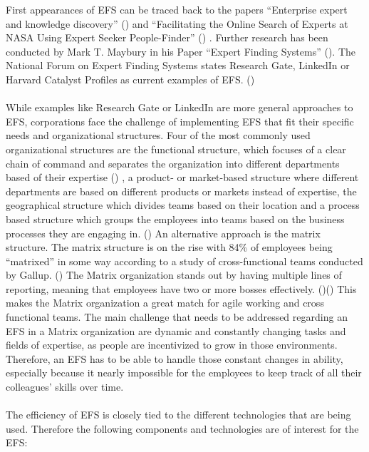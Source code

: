 First appearances of \ac{EFS} can be traced back to the papers “Enterprise expert and knowledge discovery” (\cite{mattox_enterprise_1999}) and 
“Facilitating the Online Search of Experts at NASA Using Expert Seeker People-Finder” (\cite{becerra-fernandez_facilitating_nodate}) . Further research has been 
conducted by Mark T. Maybury in his Paper “Expert Finding Systems” (\cite{maybury_expert_2006}). The National Forum on Expert Finding Systems states Research 
Gate, LinkedIn or Harvard Catalyst Profiles as current examples of \ac{EFS}. (\cite{noauthor_national_nodate})
\\ \\
While examples like Research Gate or LinkedIn are more 
general approaches to \ac{EFS}, corporations face the challenge of implementing \ac{EFS} that fit their specific needs and organizational structures.
Four of the most commonly used organizational structures are the functional structure, which focuses of a clear chain of command and separates the organization 
into different departments based of their expertise (\cite{noauthor_what_nodate-1}) , a product- or market-based structure where different departments are based on 
different products or markets instead of expertise, the geographical structure which divides teams based on their location and a process based structure which 
groups the employees into teams based on the business processes they are engaging in. (\cite{organ_7_2023})   
An alternative approach is the matrix structure. The matrix structure is on the rise with 84\% of employees being “matrixed” in some way according to a study of 
cross-functional teams conducted by Gallup. (\cite[page 65]{inc_state_nodate}) The Matrix organization stands out by having multiple lines of reporting, meaning 
that employees have two or more bosses effectively. (\cite{noauthor_what_nodate})(\cite{organ_7_2023}) This makes the Matrix organization a great match for agile working and cross functional teams. The main challenge that needs to be addressed regarding an \ac{EFS} in a Matrix organization are dynamic and constantly changing tasks and fields of expertise, as people are incentivized to grow in those environments.
Therefore, an \ac{EFS} has to be able to handle those constant changes in ability, especially because it nearly impossible for the employees to keep track of all their 
colleagues’ skills over time.
\\ \\
The efficiency of \ac{EFS} is closely tied to the different technologies that are being used. Therefore the following components and technologies are of interest for the \ac{EFS}:
